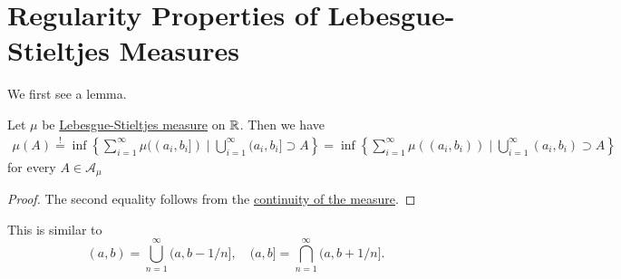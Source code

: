 \section{Regularity Properties of Lebesgue-Stieltjes Measures}
We first see a lemma.
\begin{lemma}
	Let \(\mu\) be \hyperref[def:Lebesgue-Stieltjes-measure]{Lebesgue-Stieltjes measure} on \(\mathbb{\MakeUppercase{r}} \). Then we have
	\[
		\begin{split}
			\mu (A) \overset{\hyperref[prop:outer-measure]{!}}{=}\inf\left\{\sum\limits_{i=1}^{\infty} \mu ((a_{i}, b_{i}]) \mid \bigcup\limits_{i=1}^{\infty} (a_{i}, b_{i}]\supset A\right\}
			= \inf\left\{\sum\limits_{i=1}^{\infty} \mu ((a_{i}, b_{i})) \mid \bigcup\limits_{i=1}^{\infty} (a_{i}, b_{i})\supset A\right\}
		\end{split}
	\]
	for every \(A\in \mathcal{A} _\mu \)
\end{lemma}
\begin{proof}
	The second equality follows from the \hyperref[thm:measure-space]{continuity of the measure}.
\end{proof}

\begin{remark}
	This is similar to
	\[
		(a, b) = \bigcup\limits_{n=1}^{\infty} (a, b - 1/n],\quad (a, b] = \bigcap\limits_{n=1}^{\infty} (a, b+1/n].
	\]
\end{remark}